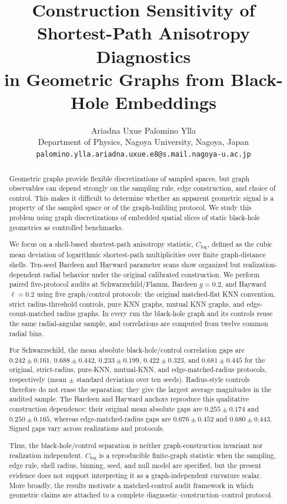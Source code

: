 \documentclass[11pt]{article}
\title{Construction Sensitivity of Shortest-Path Anisotropy Diagnostics\\
in Geometric Graphs from Black-Hole Embeddings}
\author{Ariadna Uxue Palomino Ylla\\
Department of Physics, Nagoya University, Nagoya, Japan\\
\texttt{palomino.ylla.ariadna.uxue.e8@s.mail.nagoya-u.ac.jp}}
\date{}
\newcommand{\clog}{C_{\log}}
\begin{document}
\maketitle

\begin{abstract}
Geometric graphs provide flexible discretizations of sampled spaces, but graph
observables can depend strongly on the sampling rule, edge construction, and
choice of control. This makes it difficult to determine whether an apparent
geometric signal is a property of the sampled space or of the graph-building
protocol. We study this problem using graph discretizations of embedded spatial
slices of static black-hole geometries as controlled benchmarks.

We focus on a shell-based shortest-path anisotropy statistic, $\clog$, defined
as the cubic mean deviation of logarithmic shortest-path multiplicities over
finite graph-distance shells. Ten-seed Bardeen and Hayward parameter scans show
organized but realization-dependent radial behavior under the original
calibrated construction. We perform paired five-protocol audits at
Schwarzschild/Flamm, Bardeen $g=0.2$, and Hayward $\ell=0.2$ using
five graph/control protocols: the original matched-flat KNN convention, strict
radius-threshold controls, pure KNN graphs, mutual KNN graphs, and
edge-count-matched radius graphs. In every run the black-hole graph and its
controls reuse the same radial-angular sample, and correlations are computed
from twelve common radial bins.

For Schwarzschild, the mean absolute black-hole/control correlation gaps are
$0.242\pm0.161$, $0.688\pm0.442$, $0.233\pm0.199$,
$0.422\pm0.323$, and $0.681\pm0.445$ for the original, strict-radius,
pure-KNN, mutual-KNN, and edge-matched-radius protocols, respectively
(mean $\pm$ standard deviation over ten seeds). Radius-style controls therefore
do not erase the separation; they give the largest average magnitudes in the
audited sample. The Bardeen and Hayward anchors reproduce this qualitative
construction dependence: their original mean absolute gaps are $0.255\pm0.174$
and $0.250\pm0.165$, whereas edge-matched-radius gaps are $0.676\pm0.452$ and
$0.680\pm0.443$. Signed gaps vary across realizations and protocols.

Thus, the black-hole/control separation is neither graph-construction invariant
nor realization independent. $\clog$ is a reproducible finite-graph statistic
when the sampling, edge rule, shell radius, binning, seed, and null model are
specified, but the present evidence does not support interpreting it as a
graph-independent curvature scalar. More broadly, the results motivate a
matched-control audit framework in which geometric claims are attached to a
complete diagnostic--construction--control protocol.
\end{abstract}
\end{document}
